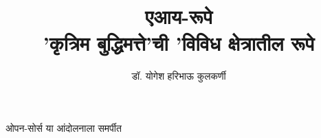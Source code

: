 
\usepackage{fontspec}
\setmainfont[Script=Devanagari]{Nirmala Text}
\newfontfamily{}
\newfontfamily{}
\graphicspath{{images/}}

\date{}

\title{
    {\Huge \textbf{\color{titlecolor} एआय-रूपे}} \\ 
    \vspace{0.5em}
    {\large \color{subtitlecolor} 'कृत्रिम बुद्धिमत्ते'ची 'विविध क्षेत्रातील रूपे}
}

\author{\textsc{\color{authorcolor}डॉ. योगेश हरिभाऊ कुलकर्णी}}

\renewcommand{\contentsname}{अनुक्रमणिका}



\frontmatter

\maketitle


\begin{dedication}
ओपन-सोर्स या आंदोलनाला समर्पीत
\end{dedication}

\tableofcontents

\mainmatter




